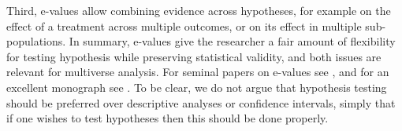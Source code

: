 \documentclass[pdflatex,sn-mathphys-num]{sn-jnl}%
\theoremstyle{thmstyleone}%
\theoremstyle{thmstyletwo}%
\theoremstyle{thmstylethree}%
\begin{document}
Third, e-values allow combining evidence across hypotheses, for example on the effect of a treatment across multiple outcomes, or on its effect in multiple sub-populations. In summary, e-values give the researcher a fair amount of flexibility for testing hypothesis while preserving statistical validity, and both issues are relevant for multiverse analysis. \color{black}
For seminal papers on e-values see \cite{vovk:2021,gruenwald:2024,chugg:2026}, and for an excellent monograph see \cite{ramdas:2025}.
To be clear, we do not argue that hypothesis testing should be preferred over descriptive analyses or confidence intervals, simply that if one wishes to test hypotheses then this should be done properly.
\end{document}
